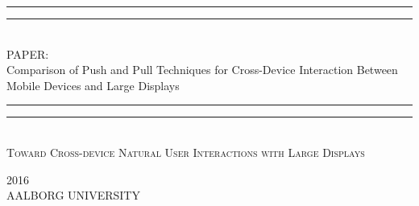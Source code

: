 
\begin{dummy}

	\textheight
	\centering
	\vspace*{\baselineskip}
	\rule{\textwidth}{1.6pt}\vspace*{-\baselineskip}\vspace*{2pt}
	\rule{\textwidth}{0.4pt}\\[\baselineskip]
	{\LARGE PAPER: \\ \hfill \break Comparison of Push and Pull Techniques for Cross-Device Interaction Between Mobile Devices and Large Displays}\\[0.2\baselineskip]
	\rule{\textwidth}{0.4pt}\vspace*{-\baselineskip}\vspace{3.2pt}
	\rule{\textwidth}{1.6pt}\\[\baselineskip]
	\scshape
	{ \large Toward Cross-device Natural User Interactions with Large Displays } \par
	\vspace*{2\baselineskip}
	\vspace*{2\baselineskip}
	\vspace*{2\baselineskip}
	\vspace*{2\baselineskip}
		
		
	\begin{newab}
		
	\end{newab}

	\vspace*{2\baselineskip}
	\vspace*{2\baselineskip}
	\vspace*{2\baselineskip}
	\vspace*{2\baselineskip}
		{\scshape 2016} \\
		{\large AALBORG UNIVERSITY}\par
	
\end{dummy}